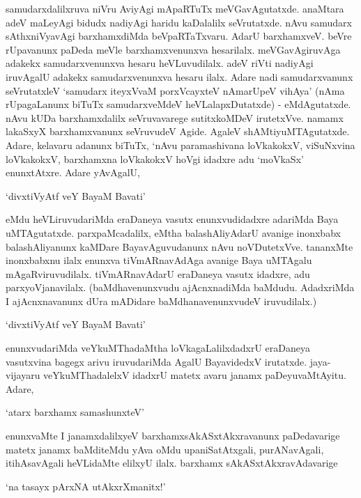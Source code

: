 samudarxdalilxruva niVru AviyAgi mApaRTuTx meVGavAgutatxde. anaMtara adeV maLeyAgi bidudx nadiyAgi haridu kaDalalilx seVrutatxde. nAvu samudarx sAthxniVyavAgi barxhamxdiMda beVpaRTaTxvaru. AdarU barxhamxveV. beVre rUpavanunx paDeda meVle barxhamxvenunxva hesarilalx. meVGavAgiruvAga adakekx samudarxvenunxva hesaru heVLuvudilalx. adeV riVti nadiyAgi iruvAgalU adakekx samudarxvenunxva hesaru ilalx. Adare nadi samudarxvanunx seVrutatxleV 
`samudarx iteyxVvaM porxVcayxteV nAmarUpeV vihAya' (nAma rUpagaLanunx biTuTx samudarxveMdeV heVLalapxDutatxde) - eMdAgutatxde. nAvu kUDa barxhamxdalilx seVruvavarege sutitxkoMDeV irutetxVve. namamx lakaSxyX barxhamxvanunx seVruvudeV Agide. AgaleV shAMtiyuMTAgutatxde. Adare, kelavaru adanunx biTuTx, `nAvu paramashivana loVkakokxV, viSuNxvina loVkakokxV, barxhamxna loVkakokxV hoVgi idadxre adu `moVkaSx' enunxtAtxre. Adare yAvAgalU, 

\begin{shloka}
`divxtiVyAtf veY BayaM Bavati'
\end{shloka}

\noindent eMdu heVLiruvudariMda eraDaneya vasutx enunxvudidadxre adariMda Baya uMTAgutatxde. parxpaMcadalilx, eMtha balashAliyAdarU avanige inonxbabx balashAliyanunx kaMDare BayavAguvudanunx nAvu noVDutetxVve. tananxMte inonxbabxnu ilalx enunxva tiVmARnavAdAga avanige Baya uMTAgalu mAgaRviruvudilalx. tiVmARnavAdarU eraDaneya vasutx idadxre, adu parxyoVjanavilalx. (baMdhavenunxvudu ajAcnxnadiMda baMdudu. AdadxriMda I ajAcnxnavanunx dUra mADidare baMdhanavenunxvudeV iruvudilalx.)

\begin{shloka}
`divxtiVyAtf veY BayaM Bavati'
\end{shloka}

enunxvudariMda veYkuMThadaMtha loVkagaLalilxdadxrU eraDaneya vasutxvina bagegx arivu iruvudariMda AgalU BayavidedxV irutatxde. jaya-vijayaru veYkuMThadalelxV idadxrU matetx avaru janamx paDeyuvaMtAyitu. Adare,

\begin{shloka}
`atarx barxhamx samashunxteV'
\end{shloka}

\noindent enunxvaMte I janamxdalilxyeV barxhamxsAkASxtAkxravanunx paDedavarige matetx janamx baMditeMdu yAva oMdu upaniSatAtxgali, purANavAgali, itihAsavAgali heVLidaMte elilxyU ilalx. barxhamx sAkASxtAkxravAdavarige

\begin{shloka}
`na tasayx pArxNA utAkxrXmanitx!'
\end{shloka}

